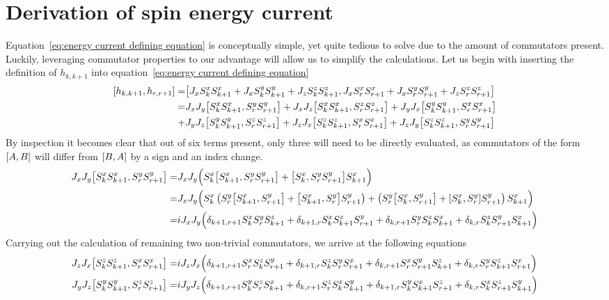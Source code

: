 \chapter{Derivation of spin energy current\label{app:spin energy current derivation}}
\thispagestyle{chapterBeginStyle}

Equation~\eqref{eq:energy current defining equation} is
conceptually simple, yet quite tedious to solve due to the amount of commutators present. Luckily, leveraging commutator properties
to our advantage will allow us to simplify the calculations. Let us begin with inserting the definition of \(h_{k,k+1}\) into 
equation~\eqref{eq:energy current defining equation}
\begin{align*}
    \comm{h_{k,k+1}}{h_{r,r+1}} =& \comm{J_{x} \Sx_{k}\Sx_{k+1} + J_{x} \Sy_{k}\Sy_{k+1} + J_{z} \Sz_{k}\Sz_{k+1}}{J_{x} \Sx_{r}\Sx_{r+1} + J_{x} \Sy_{r}\Sy_{r+1} + J_{z} \Sz_{r}\Sz_{r+1}}\\
    =& J_{x} J_{y}\comm{\Sx_{k}\Sx_{k+1}}{\Sy_{r}\Sy_{r+1}} + J_{x} J_{z}\comm{\Sx_{k}\Sx_{k+1}}{\Sz_{r}\Sz_{r+1}} + J_{y} J_{x}\comm{\Sy_{k}\Sy_{k+1}}{\Sx_{r}\Sx_{r+1}}\\
    +& J_{y} J_{z}\comm{\Sy_{k}\Sy_{k+1}}{\Sz_{r}\Sz_{r+1}} + J_{z} J_{x}\comm{\Sz_{k}\Sz_{k+1}}{\Sx_{r}\Sx_{r+1}} + J_{z} J_{y}\comm{\Sz_{k}\Sz_{k+1}}{\Sy_{r}\Sy_{r+1}}  
\end{align*}
By inspection it becomes clear that out of six terms present, only three will need to be directly evaluated, as commutators of the form
\(\comm{A}{B}\) will differ from \(\comm{B}{A}\) by a sign and an index change.
\begin{align*}
    J_{x} J_{y}\comm{\Sx_{k}\Sx_{k+1}}{\Sy_{r}\Sy_{r+1}} =& J_x J_y \Big(\Sx_k\comm{\Sx_{k+1}}{\Sy_{r}\Sy_{r+1}} + \comm{\Sx_{k}}{\Sy_{r}\Sy_{r+1}} \Sx_{k+1} \Big)\\
    =& J_x J_y \Big( \Sx_k \left( \Sy_r \comm{\Sx_{k+1}}{\Sy_{r+1}} + \comm{\Sx_{k+1}}{\Sy_{r}} \Sy_{r+1}\right) + 
    \left( \Sy_r \comm{\Sx_{k}}{\Sy_{r+1}} + \comm{\Sx_{k}}{\Sy_{r}} \Sy_{r+1} \right)\Sx_{k+1} \Big)\\
    =& i J_x J_y \Big( \delta_{k+1,r+1} \Sx_k \Sy_r \Sz_{k+1} + \delta_{k+1,r} \Sx_k \Sz_{k+1} \Sy_{r+1} + \delta_{k,r+1} \Sy_r \Sz_k \Sx_{k+1} +\delta_{k,r} \Sz_k \Sy_{r+1} \Sx_{k+1}\Big)
\end{align*}
Carrying out the calculation of remaining two non-trivial commutators, we arrive at the following equations
\begin{align*}
    J_{z} J_{x}\comm{\Sz_{k}\Sz_{k+1}}{\Sx_{r}\Sx_{r+1}} =& i J_z J_x \Big( \delta_{k+1,r+1} \Sx_r \Sz_k \Sy_{r+1} + \delta_{k+1,r} \Sz_k \Sy_{r} \Sx_{r+1} + \delta_{k,r+1} \Sx_r \Sy_{r+1} \Sz_{k+1} +\delta_{k,r} \Sy_r \Sz_{k+1} \Sx_{r+1}\Big)\\ 
    J_{y} J_{z}\comm{\Sy_{k}\Sy_{k+1}}{\Sz_{r}\Sz_{r+1}} =& i J_y J_z \Big( \delta_{k+1,r+1} \Sy_k \Sz_r \Sx_{k+1} + \delta_{k,r+1} \Sz_r \Sx_{k} \Sy_{k+1} + \delta_{k+1,r} \Sy_k \Sx_{k+1} \Sz_{r+1} +\delta_{k,r} \Sx_k \Sz_{r+1} \Sy_{k+1}\Big) 
\end{align*}
